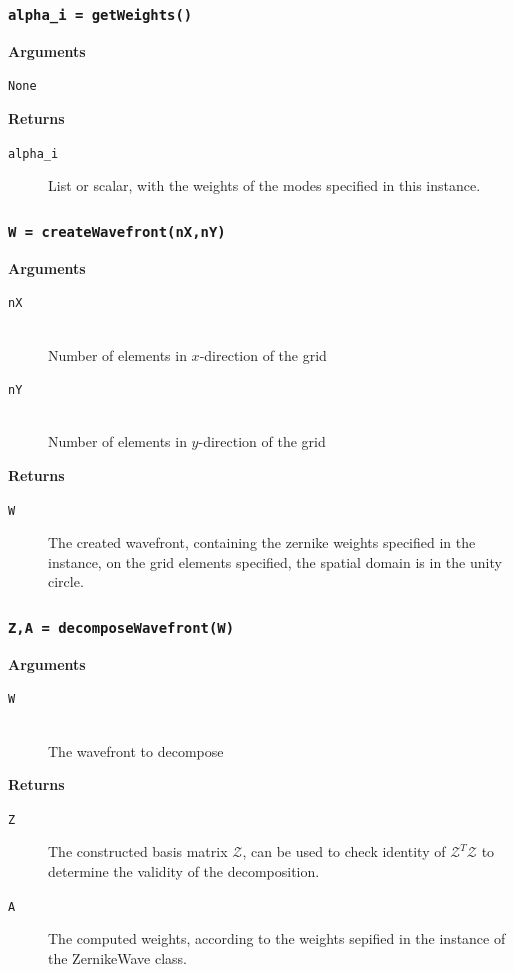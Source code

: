 \documentclass{article}
\begin{document}
\newpage
\subsubsection*{\texttt{alpha\_i = getWeights()}}
\textbf{Arguments}
\begin{description}
	\item[\texttt{None}]
\end{description}
\textbf{Returns}
\begin{description}
	\item[\texttt{alpha\_i}]
	List or scalar, with the weights of the modes specified in this instance.
\end{description}

\newpage
\subsubsection*{\texttt{W = createWavefront(nX,nY)}}
\textbf{Arguments}
\begin{description}
  \item[\texttt{nX}] \hfill \\
  Number of elements in $x$-direction of the grid
  \item[\texttt{nY}] \hfill \\
 	Number of elements in $y$-direction of the grid
\end{description}
\textbf{Returns}
\begin{description}
	\item[\texttt{W}]
	The created wavefront, containing the zernike weights specified in the instance, on the grid elements specified, the spatial domain is in the unity circle.
\end{description}

\newpage
\subsubsection*{\texttt{Z,A = decomposeWavefront(W)}}
\textbf{Arguments}
\begin{description}
  \item[\texttt{W}] \hfill \\
  The wavefront to decompose
\end{description}
\textbf{Returns}
\begin{description}
	\item[\texttt{Z}]
	The constructed basis matrix $\mathcal{Z}$, can be used to check identity of $\mathcal{Z}^T \mathcal{Z}$ to determine the validity of the decomposition.
	\item[\texttt{A}]
	The computed weights, according to the weights sepified in the instance of the ZernikeWave class.
\end{description}
\end{document}
